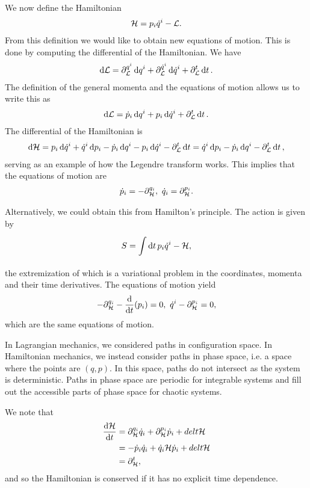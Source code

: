 We now define the Hamiltonian
\begin{align*}
	\mathcal{H} = p_{i}\dot{q}^{i} - \mathcal{L}.
\end{align*}
From this definition we would like to obtain new equations of motion. This is done by computing the differential of the Hamiltonian. We have
\begin{align*}
	\dd{\ensuremath{\mathcal{L}}} = \partial^{q^{i}}_{\mathcal{L}}\dd{q^{i}} + \partial^{\dot{q}^{i}}_{\mathcal{L}}\dd{\dot{q}^{i}} + \partial^{t}_{\mathcal{L}}\dd{t}.
\end{align*}
The definition of the general momenta and the equations of motion allows us to write this as
\begin{align*}
	\dd{\ensuremath{\mathcal{L}}} = \dot{p}_{i}\dd{q^{i}} + p_{i}\dd{\dot{q}^{i}} + \partial^{t}_{\mathcal{L}}\dd{t}.
\end{align*}
The differential of the Hamiltonian is
\begin{align*}
	\dd{\ensuremath{\mathcal{H}}} = p_{i}\dd{\dot{q}^{i}} + \dot{q}^{i}\dd{p_{i}} - \dot{p}_{i}\dd{q^{i}} - p_{i}\dd{\dot{q}^{i}} - \partial^{t}_{\mathcal{L}}\dd{t} = \dot{q}^{i}\dd{p_{i}} - \dot{p}_{i}\dd{q^{i}} - \partial^{t}_{\mathcal{L}}\dd{t},
\end{align*}
serving as an example of how the Legendre transform works. This implies that the equations  of motion are
\begin{align*}
	\dot{p}_{i} = -\partial^{q_{i}}_{\mathcal{H}},\ \dot{q}_{i} = \partial^{p_{i}}_{\mathcal{H}}.
\end{align*}

Alternatively, we could obtain this from Hamilton's principle. The action is given by
\begin{align*}
	S = \int\limits_{}^{}\dd{t}{p_{i}\dot{q}^{i} - \ensuremath{\mathcal{H}}},
\end{align*}
the extremization of which is a variational problem in the coordinates, momenta and their time derivatives. The equations of motion yield
\begin{align*}
	-\partial^{q_{i}}_{\mathcal{H}} - \dv{t}(p_{i}) = 0,\ \dot{q}^{i} - \partial^{p_{i}}_{\mathcal{H}} = 0,
\end{align*}
which are the same equations of motion.

In Lagrangian mechanics, we considered paths in configuration space. In Hamiltonian mechanics, we instead consider paths in phase space, i.e. a space where the points are $(q, p)$. In this space, paths do not intersect as the system is deterministic. Paths in phase space are periodic for integrable systems and fill out the accessible parts of phase space for chaotic systems.

We note that
\begin{align*}
	\dv{\ensuremath{\mathcal{H}}}{t} &= \partial^{q_{i}}_{\mathcal{H}}\dot{q}_{i} + \partial^{p_{i}}_{\mathcal{H}}\dot{p}_{i} + del{t}{\mathcal{H}} \\
	             &= -\dot{p}_{i}\dot{q}_{i} + \dot{q}_{i}{\mathcal{H}}\dot{p}_{i} + del{t}{\mathcal{H}} \\
	             &= \partial^{t}_{\mathcal{H}},
\end{align*}
and so the Hamiltonian is conserved if it has no explicit time dependence.

